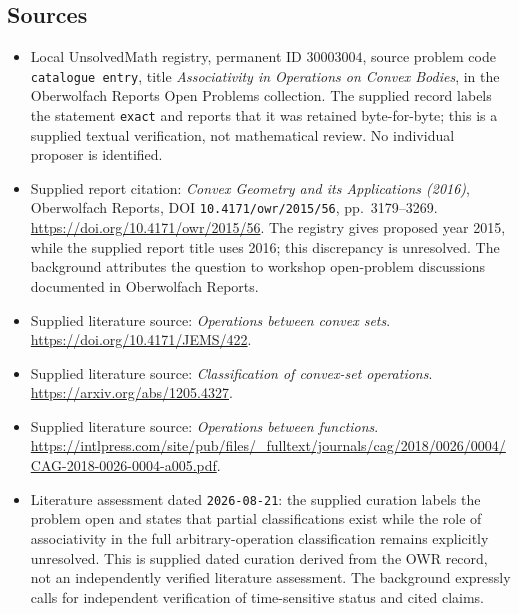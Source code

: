 \documentclass[11pt]{article}
\begin{document}
\subsection{Sources}
\begin{itemize}
\item Local UnsolvedMath registry, permanent ID \(30003004\), source problem code \texttt{catalogue entry}, title \emph{Associativity in Operations on Convex Bodies}, in the Oberwolfach Reports Open Problems collection. The supplied record labels the statement \texttt{exact} and reports that it was retained byte-for-byte; this is a supplied textual verification, not mathematical review. No individual proposer is identified.
\item Supplied report citation: \emph{Convex Geometry and its Applications (2016)}, Oberwolfach Reports, DOI \texttt{10.4171/owr/2015/56}, pp.\ 3179--3269. \url{https://doi.org/10.4171/owr/2015/56}. The registry gives proposed year 2015, while the supplied report title uses 2016; this discrepancy is unresolved. The background attributes the question to workshop open-problem discussions documented in Oberwolfach Reports.
\item Supplied literature source: \emph{Operations between convex sets}. \url{https://doi.org/10.4171/JEMS/422}.
\item Supplied literature source: \emph{Classification of convex-set operations}. \url{https://arxiv.org/abs/1205.4327}.
\item Supplied literature source: \emph{Operations between functions}. \url{https://intlpress.com/site/pub/files/_fulltext/journals/cag/2018/0026/0004/CAG-2018-0026-0004-a005.pdf}.
\item Literature assessment dated \texttt{2026-08-21}: the supplied curation labels the problem open and states that partial classifications exist while the role of associativity in the full arbitrary-operation classification remains explicitly unresolved. This is supplied dated curation derived from the OWR record, not an independently verified literature assessment. The background expressly calls for independent verification of time-sensitive status and cited claims.
\end{itemize}
\end{document}
